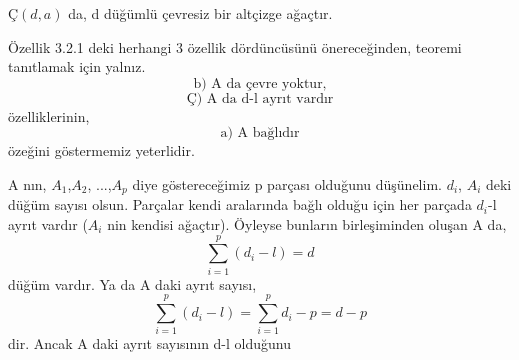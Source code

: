 \documentclass[11pt]{amsbook}
\begin{document}

\begin{theorem}
    \( Ç(d, a) \) da, d düğümlü çevresiz bir altçizge ağaçtır.
\end{theorem}

\begin{definition}
	Özellik 3.2.1 deki herhangi 3 özellik dördüncüsünü önereceğinden, teoremi tanıtlamak için yalnız.
   	 \[
		\text{b) A da çevre yoktur,}
	\]
	 \[
		\text{Ç) A da d-l ayrıt vardır}
	\]
	özelliklerinin,
	 \[
		\text{a) A bağlıdır}
	\]
	özeğini göstermemiz yeterlidir.

	A nın, \( A_1 \),\( A_2 \), ...,\( A_p \) diye göstereceğimiz p parçası olduğunu düşünelim. \( d_i \), \( A_i \) deki düğüm sayısı olsun. Parçalar kendi aralarında bağlı olduğu için her parçada \( d_i \)-l ayrıt vardır (\( A_i \) nin kendisi ağaçtır). Öyleyse bunların birleşiminden oluşan A da,
	\[
		\sum\limits_{i=1}^p (d_i -l) = d
	\]
    	düğüm vardır. Ya da A daki ayrıt sayısı,
	\[
		\sum\limits_{i=1}^p (d_i -l) = \sum\limits_{i=1}^p d_i -p=d-p
	\]
	dir. Ancak A daki ayrıt sayısının d-l olduğunu
\end{definition}
\end{document}
